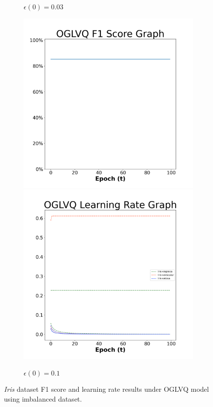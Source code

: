 \begin{figure}[H]
\begin{subfigure}{0.3\textwidth}
  \caption{$\epsilon(0)=0.03$}
\end{subfigure}\hfil %
\begin{subfigure}{0.3\textwidth}
  \includegraphics[width=\linewidth]{images/exper2/iris/OGLVQ_0.1_f1.png}
  \includegraphics[width=\linewidth]{images/exper2/iris/OGLVQ_0.1_lr.png}
  \caption{$\epsilon(0)=0.1$}
\end{subfigure}

\caption{\textit{Iris} dataset F1 score and learning rate results under OGLVQ model using imbalanced dataset.}
\end{figure}



